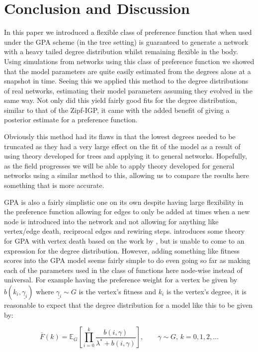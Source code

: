 \documentclass[
  sn-basic,
]{sn-jnl}
\theoremstyle{plain}
\theoremstyle{remark}
\begin{document}
\section{Conclusion and Discussion}\label{sec-conc}

In this paper we introduced a flexible class of preference function that
when used under the GPA scheme (in the tree setting) is guaranteed to
generate a network with a heavy tailed degree distribution whilst
remaining flexible in the body. Using simulations from networks using
this class of preference function we showed that the model parameters
are quite easily estimated from the degrees alone at a snapshot in time.
Seeing this we applied this method to the degree distributions of real
networks, estimating their model parameters assuming they evolved in the
same way. Not only did this yield fairly good fits for the degree
distribution, similar to that of the Zipf-IGP, it came with the added
benefit of giving a posterior estimate for a preference function.

Obviously this method had its flaws in that the lowest degrees needed to
be truncated as they had a very large effect on the fit of the model as
a result of using theory developed for trees and applying it to general
networks. Hopefully, as the field progresses we will be able to apply
theory developed for general networks using a similar method to this,
allowing us to compare the results here something that is more accurate.

GPA is also a fairly simplistic one on its own despite having large
flexibility in the preference function allowing for edges to only be
added at times when a new node is introduced into the network and not
allowing for anything like vertex/edge death, reciprocal edges and
rewiring steps. \citep{deijfen2015} introduces some theory for GPA with
vertex death based on the work by \citep{rudas07}, but is unable to come
to an expression for the degree distribution. However, adding something
like fitness scores into the GPA model seems fairly simple to do even
going so far as making each of the parameters used in the class of
functions here node-wise instead of universal. For example having the
preference weight for a vertex be given by
\(b(k_i, \underline{\gamma_i})\) where \(\underline{\gamma_i}\sim G\) is
the vertex's fitness and \(k_i\) is the vertex's degree, it is
reasonable to expect that the degree distribution for a model like this
to be given by:

\[
\bar F(k) = \mathbb E_G\left[\prod_{i=0}^k \frac{b(i, \gamma)}{\lambda^* + b(i,\gamma)}\right],\qquad \gamma\sim G,\, k=0,1,2,\ldots
\]
\end{document}
